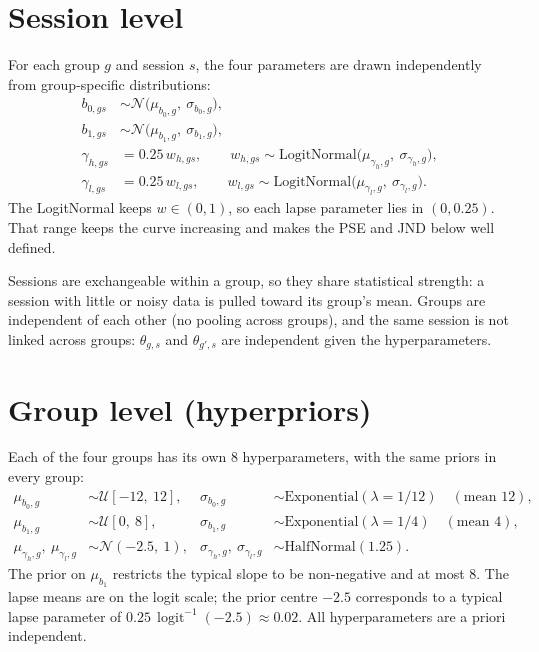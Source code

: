 \documentclass[11pt]{article}
\newcommand{\invlogit}{\operatorname{logit}^{-1}}
\begin{document}
\section{Session level}

For each group $g$ and session $s$, the four parameters are drawn independently
from group-specific distributions:
\begin{align*}
  b_{0,gs} &\sim \mathcal{N}\big(\mu_{b_0,g},\ \sigma_{b_0,g}\big), \\
  b_{1,gs} &\sim \mathcal{N}\big(\mu_{b_1,g},\ \sigma_{b_1,g}\big), \\
  \gamma_{h,gs} &= 0.25\, w_{h,gs}, \qquad
      w_{h,gs} \sim \text{LogitNormal}\big(\mu_{\gamma_h,g},\ \sigma_{\gamma_h,g}\big), \\
  \gamma_{l,gs} &= 0.25\, w_{l,gs}, \qquad
      w_{l,gs} \sim \text{LogitNormal}\big(\mu_{\gamma_l,g},\ \sigma_{\gamma_l,g}\big).
\end{align*}
The LogitNormal keeps $w \in (0,1)$, so each lapse parameter lies in
$(0, 0.25)$. That range keeps the curve increasing and makes the PSE and JND
below well defined.

Sessions are exchangeable within a group, so they share statistical strength:
a session with little or noisy data is pulled toward its group's mean. Groups
are independent of each other (no pooling across groups), and the same session
is not linked across groups: $\theta_{g,s}$ and $\theta_{g',s}$ are independent
given the hyperparameters.

\section{Group level (hyperpriors)}

Each of the four groups has its own 8 hyperparameters, with the same priors in
every group:
\begin{align*}
  \mu_{b_0,g} &\sim \mathcal{U}[-12,\ 12], &
  \sigma_{b_0,g} &\sim \text{Exponential}(\lambda = 1/12) \quad (\text{mean } 12), \\
  \mu_{b_1,g} &\sim \mathcal{U}[0,\ 8], &
  \sigma_{b_1,g} &\sim \text{Exponential}(\lambda = 1/4) \quad (\text{mean } 4), \\
  \mu_{\gamma_h,g},\ \mu_{\gamma_l,g} &\sim \mathcal{N}(-2.5,\ 1), &
  \sigma_{\gamma_h,g},\ \sigma_{\gamma_l,g} &\sim \text{HalfNormal}(1.25).
\end{align*}
The prior on $\mu_{b_1}$ restricts the typical slope to be non-negative and at
most 8. The lapse means are on the logit scale; the prior centre $-2.5$
corresponds to a typical lapse parameter of $0.25\,\invlogit(-2.5) \approx 0.02$.
All hyperparameters are a priori independent.
\end{document}
